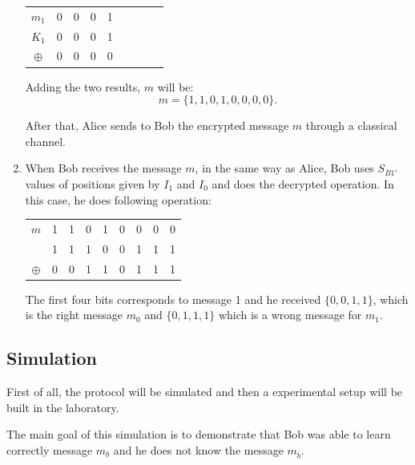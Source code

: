 \begin{enumerate}
   \begin{table}[H]
    \centering
    \begin{tabular}{c|c c c c c c c c}
     $m_{1}$ & 0 & 0 & 0 & 1 \\
     $K_{1}$ & 0 & 0 & 0 & 1 \\ \hline
     $\oplus$ & 0 & 0 & 0 & 0
    \end{tabular}
    \end{table}

    Adding the two results, $m$ will be: $$m=\{1,1,0,1,0,0,0,0\}.$$

   After that, Alice sends to Bob the encrypted message $m$ through a classical channel.

  \item When Bob receives the message $m$, in the same way as Alice, Bob uses $S_{B1\prime}$ values of positions given by $I_{1}$ and $I_{0}$ and does the decrypted operation. In this case, he does following operation:

      \begin{table}[H]
        \centering
        \begin{tabular}{c|c c c c c c c c}
         $m$ & 1 & 1 & 0 & 1 & 0 & 0 & 0 & 0 \\
             & 1 & 1 & 1 & 0 & 0 & 1 & 1 & 1 \\ \hline
         $\oplus$ & 0 & 0 & 1 & 1 & 0 & 1 & 1 & 1 \\
        \end{tabular}
        \end{table}

      The first four bits corresponds to message 1 and he received $\{0,0,1,1\}$, which is the right message $m_{0}$ and $\{0,1,1,1\}$ which is a wrong message for $m_{1}$.


\end{enumerate}

\subsection{Simulation}

First of all, the protocol will be simulated and then a experimental setup will be built in the laboratory.

The main goal of this simulation is to demonstrate that Bob was able to learn correctly message $m_{b}$ and he does not know the message $m_{\overline{b}}$.

